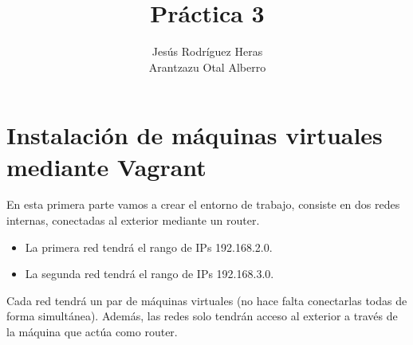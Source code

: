 \documentclass[12pt,letterpaper]{article}
\title{Práctica 3}
\author{Jesús Rodríguez Heras\\
	Arantzazu Otal Alberro}
\begin{document}
	
	\maketitle
%			
	\thispagestyle{empty}
	\newpage
	
	
	
	
	
	\lstset{language=bash, numbers=left, numberstyle=\tiny, numbersep=10pt, firstnumber=1, stepnumber=1, basicstyle=\small\ttfamily, tabsize=1, extendedchars=true, inputencoding=latin1}
	
\section{Instalación de máquinas virtuales mediante Vagrant}
En esta primera parte vamos a crear el entorno de trabajo, consiste en dos redes internas, conectadas al exterior mediante un router.
\begin{itemize}
	\item La primera red tendrá el rango de IPs 192.168.2.0.
	\item La segunda red tendrá el rango de IPs 192.168.3.0.
\end{itemize}

Cada red tendrá un par de máquinas virtuales (no hace falta conectarlas todas de forma simultánea). Además, las redes solo tendrán acceso al exterior a través de la máquina que actúa como router.
\end{document}
